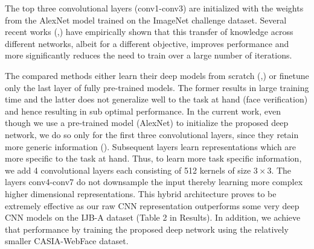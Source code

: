 \documentclass[10pt,twocolumn,letterpaper]{article}
\newenvironment{Table}
  {\par\bigskip\noindent\minipage{\columnwidth}\centering}
  {\endminipage\par\bigskip}
\begin{document}
\begin{Table}

\centering
{}
\label{arch}
\end{Table}


The top three convolutional layers (conv1-conv3) are initialized with the
weights from the AlexNet model \cite{alexnet12} trained on the ImageNet
challenge dataset. Several recent works (\cite{transfer1},\cite{transfer2}) have
empirically shown that this transfer of knowledge across different networks,
albeit for a different objective, improves performance and more significantly
reduces the need to train over a large number of iterations. 

The compared methods either learn their deep models from scratch
(\cite{parkhi15},\cite{nan}) or finetune only the last layer of fully
pre-trained models. The former results in large training time and the
latter does not generalize well to the task at hand (face verification) and
hence resulting in sub optimal performance. In the current work, even though we
use a pre-trained model (AlexNet) to initialize the proposed deep network, we do
so only for the first three convolutional layers, since they retain more generic
information (\cite{transfer1}). Subsequent layers learn representations which
are more specific to the task at hand. Thus, to learn more task specific
information, we add 4 convolutional layers each consisting of 512 kernels of
size $3\times3$. The layers conv4-conv7 do not downsample the input thereby
learning more complex higher dimensional representations. This hybrid
architecture proves to be extremely effective as our raw CNN representation
outperforms some very deep CNN models on the IJB-A dataset (Table 2 in Results).
In addition, we achieve that performance by training the proposed deep network using the
relatively smaller CASIA-WebFace dataset. 
\end{document}
